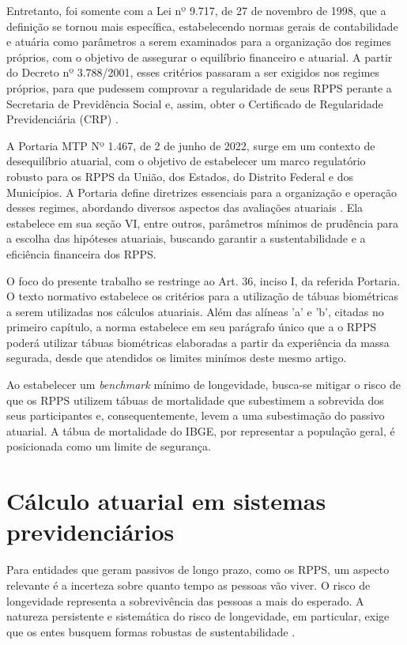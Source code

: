 Entretanto, foi somente com a Lei nº 9.717, de 27 de novembro de 1998, que a definição se tornou mais específica, estabelecendo normas gerais de contabilidade e atuária como parâmetros a serem examinados para a organização dos regimes próprios, com o objetivo de assegurar o equilíbrio financeiro e atuarial. A partir do Decreto nº 3.788/2001, esses critérios passaram a ser exigidos nos regimes próprios, para que pudessem comprovar a regularidade de seus RPPS perante a Secretaria de Previdência Social e, assim, obter o Certificado de Regularidade Previdenciária (CRP) \cite{puchalski2022}.

A Portaria MTP Nº 1.467, de 2 de junho de 2022, surge em um contexto de desequilíbrio atuarial, com o objetivo de estabelecer um marco regulatório robusto para os RPPS da União, dos Estados, do Distrito Federal e dos Municípios. A Portaria define diretrizes essenciais para a organização e operação desses regimes, abordando diversos aspectos das avaliações atuariais \cite{silva2024sustentabilidade}. Ela estabelece em sua seção VI, entre outros, parâmetros mínimos de prudência para a escolha das hipóteses atuariais, buscando garantir a sustentabilidade e a eficiência financeira dos RPPS.

O foco do presente trabalho se restringe ao Art. 36, inciso I, da referida Portaria. O texto normativo estabelece os critérios para a utilização de tábuas biométricas a serem utilizadas nos cálculos atuariais. Além das alíneas 'a' e 'b', citadas no primeiro capítulo, a norma estabelece em seu parágrafo único que a o RPPS poderá utilizar tábuas biométricas elaboradas a partir da experiência da massa segurada, desde que atendidos os limites minímos deste mesmo artigo.

Ao estabelecer um \textit{benchmark} mínimo de longevidade, busca-se mitigar o risco de que os RPPS utilizem tábuas de mortalidade que subestimem a sobrevida dos seus participantes e, consequentemente, levem a uma subestimação do passivo atuarial. A tábua de mortalidade do IBGE, por representar a população geral, é posicionada como um limite de segurança.

\section{\textbf{Cálculo atuarial em sistemas previdenciários}}

Para entidades que geram passivos de longo prazo, como os RPPS, um aspecto relevante é a incerteza sobre quanto tempo as pessoas vão viver. O risco de longevidade representa a sobrevivência das pessoas a mais do esperado. A natureza persistente e sistemática do risco de longevidade, em particular, exige que os entes busquem formas robustas de sustentabilidade \cite{bravo2007}.

